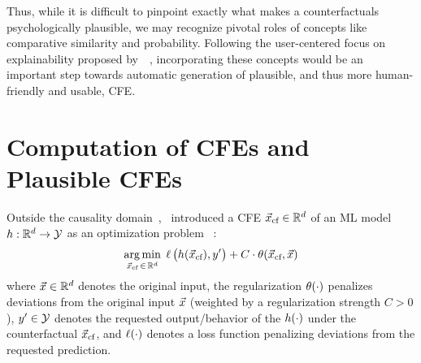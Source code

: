 Thus, while it is difficult to pinpoint exactly what makes a counterfactuals psychologically plausible, we may recognize pivotal roles of concepts like comparative similarity and probability.
Following the user-centered focus on explainability proposed by~\citeauthor{miller_explanation_2019}~\citep{miller_explanation_2019}, incorporating these concepts would be an important step towards automatic generation of plausible, and thus more human-friendly and usable, \gls{CFE}.

\section{Computation of CFEs and Plausible CFEs}\label{sec:EffCompCFs}
Outside the causality domain~\citep{halpern_causes_2020,karimi_survey_2020},~\citeauthor{wachter_counterfactual_2017} introduced a \gls{CFE} ${\vec{x}_{\text{cf}}}\in\mathbb{R}^d$ of an \gls{ML} model $h:\mathbb{R}^d\to\mathcal{Y}$ as an optimization problem~\citep{wachter_counterfactual_2017} :
\begin{equation}\label{eq:counterfactual_opt_original}
\underset{{\vec{x}_{\text{cf}}} \,\in\, \mathbb{R}^d}{\arg\min}\; \operatorname*{{\ell}}\big(h({\vec{x}_{\text{cf}}}), y'\big) + C \cdot \operatorname*{{\theta}}({\vec{x}_{\text{cf}}}, \vec{x})
\end{equation}
where $\vec{x}\in\mathbb{R}^d$ denotes the original input, the regularization $\operatorname*{{\theta}}(\cdot)$ penalizes deviations from the original input $\vec{x}$ (weighted by a regularization strength $C>0$), $y'\in\mathcal{Y}$ denotes the requested output/behavior of the $h(\cdot)$ under the counterfactual ${\vec{x}_{\text{cf}}}$, and $\operatorname*{{\ell}}(\cdot)$ denotes a loss function penalizing deviations from the requested prediction.

